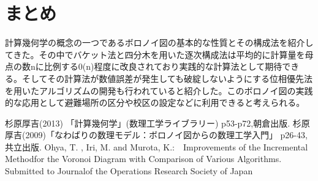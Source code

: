 \documentclass[10pt,a4paper,titlepage]{jsarticle}
\begin{document}


\section{まとめ}
計算幾何学の概念の一つであるボロノイ図の基本的な性質とその構成法を紹介してきた。その中でバケット法と四分木を用いた逐次構成法は平均的に計算量を母点の数nに比例する0(n)程度に改良されており実践的な計算法として期待できる。そしてその計算法が数値誤差が発生しても破綻しないようにする位相優先法を用いたアルゴリズムの開発も行われていると紹介した。このボロノイ図の実践的な応用として避難場所の区分や校区の設定などに利用できると考えられる。

\begin{thebibliography}{99}
 杉原厚吉(2013) 「計算幾何学」(数理工学ライブラリー) p53-p72,朝倉出版.
 杉原厚吉(2009)「なわばりの数理モデル：ボロノイ図からの数理工学入門」 p26-43,共立出版.
 Ohya, T. , Iri, M. and Murota, K.:　Improvements of the Incremental Methodfor the Voronoi Diagram with Comparison of Various Algorithms. Submitted to Journalof the Operations Research Society of Japan
\end{thebibliography}
\end{document}

